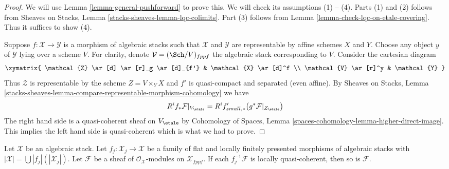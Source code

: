 \begin{proof}
We will use
Lemma \ref{lemma-general-pushforward}
to prove this. We will check its assumptions (1) -- (4).
Parts (1) and (2) follows from
Sheaves on Stacks, Lemma \ref{stacks-sheaves-lemma-lqc-colimits}.
Part (3) follows from
Lemma \ref{lemma-check-lqc-on-etale-covering}.
Thus it suffices to show (4).

\medskip\noindent
Suppose $f : \mathcal{X} \to \mathcal{Y}$ is a morphism of algebraic stacks
such that $\mathcal{X}$ and $\mathcal{Y}$ are representable by affine
schemes $X$ and $Y$. Choose any object $y$ of $\mathcal{Y}$ lying over a
scheme $V$. For clarity, denote $\mathcal{V} = (\Sch/V)_{fppf}$ the
algebraic stack corresponding to $V$. Consider the cartesian diagram
$$
\xymatrix{
\mathcal{Z} \ar[d] \ar[r]_g \ar[d]_{f'} & \mathcal{X} \ar[d]^f \\
\mathcal{V} \ar[r]^y & \mathcal{Y}
}
$$
Thus $\mathcal{Z}$ is representable by the scheme $Z = V \times_Y X$
and $f'$ is quasi-compact and separated (even affine). By
Sheaves on Stacks, Lemma
\ref{stacks-sheaves-lemma-compare-representable-morphism-cohomology}
we have
$$
R^if_*\mathcal{F}|_{V_\etale} =
R^if'_{small, *}\big(g^*\mathcal{F}|_{Z_\etale}\big)
$$
The right hand side is a quasi-coherent sheaf on $V_\etale$ by
Cohomology of Spaces, Lemma
\ref{spaces-cohomology-lemma-higher-direct-image}.
This implies the left hand side is quasi-coherent which is what
we had to prove.
\end{proof}

\begin{lemma}
\label{lemma-check-lqc-on-flat-covering}
Let $\mathcal{X}$ be an algebraic stack. Let
$f_j : \mathcal{X}_j \to \mathcal{X}$ be a family of flat
and locally finitely presented morphisms of algebraic stacks with
$|\mathcal{X}| =\bigcup |f_j|(|\mathcal{X}_j|)$.
Let $\mathcal{F}$ be a sheaf of $\mathcal{O}_\mathcal{X}$-modules
on $\mathcal{X}_{fppf}$. If each $f_j^{-1}\mathcal{F}$
is locally quasi-coherent, then so is $\mathcal{F}$.
\end{lemma}

